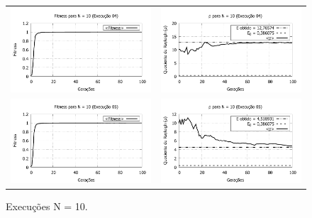 \begin{figure}[phtb]
\begin{tabular}{@{}cc@{}}
		\includegraphics[width=.40\textwidth]{figs/resultados/fitnessGrad/N10_04_fitness.pdf} &
    \includegraphics[width=.40\textwidth]{figs/resultados/fitnessGrad/N10_04_rho.pdf}   \\
		\includegraphics[width=.40\textwidth]{figs/resultados/fitnessGrad/N10_05_fitness.pdf} &
    \includegraphics[width=.40\textwidth]{figs/resultados/fitnessGrad/N10_05_rho.pdf}
  \end{tabular}
  \caption{Execuções N = 10.}
	\label{fig:execucoes_N10}
\end{figure}

